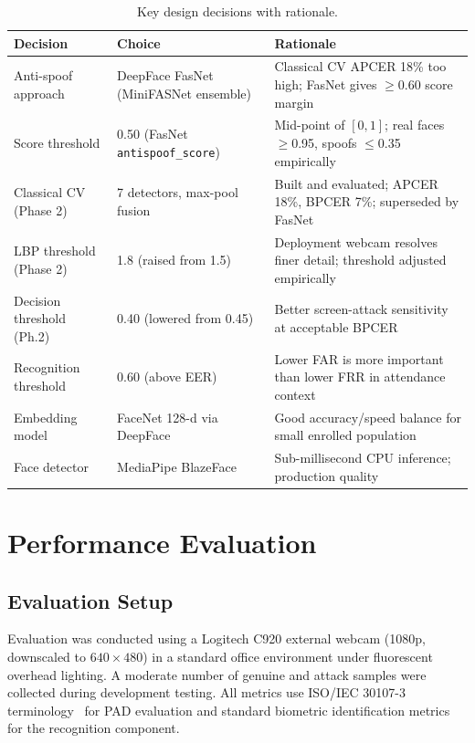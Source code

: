 \documentclass[11pt,a4paper]{article}
\begin{document}
\begin{table}[H]
\centering
\caption{Key design decisions with rationale.}
\label{tab:decisions}
\renewcommand{\arraystretch}{1.25}
\begin{tabularx}{\textwidth}{@{}lXX@{}}
\toprule
\textbf{Decision} & \textbf{Choice} & \textbf{Rationale} \\
\midrule
Anti-spoof approach    & DeepFace FasNet (MiniFASNet ensemble)   & Classical CV APCER 18\% too high; FasNet gives $\geq$0.60 score margin \\
Score threshold        & 0.50 (FasNet \texttt{antispoof\_score}) & Mid-point of $[0,1]$; real faces $\geq$0.95, spoofs $\leq$0.35 empirically \\
Classical CV (Phase 2) & 7 detectors, max-pool fusion & Built and evaluated; APCER 18\%, BPCER 7\%; superseded by FasNet \\
LBP threshold (Phase 2)& 1.8 (raised from 1.5)        & Deployment webcam resolves finer detail; threshold adjusted empirically \\
Decision threshold (Ph.2) & 0.40 (lowered from 0.45)  & Better screen-attack sensitivity at acceptable BPCER \\
Recognition threshold  & 0.60 (above EER)             & Lower FAR is more important than lower FRR in attendance context \\
Embedding model        & FaceNet 128-d via DeepFace   & Good accuracy/speed balance for small enrolled population \\
Face detector          & MediaPipe BlazeFace          & Sub-millisecond CPU inference; production quality \\
\bottomrule
\end{tabularx}
\end{table}

\section{Performance Evaluation}
\label{sec:evaluation}

\subsection{Evaluation Setup}

Evaluation was conducted using a Logitech C920 external webcam (1080p, downscaled
to $640\times 480$) in a standard office environment under fluorescent overhead
lighting.
A moderate number of genuine and attack samples were collected during development
testing.
All metrics use ISO/IEC 30107-3 terminology~\cite{iso30107} for PAD evaluation
and standard biometric identification metrics for the recognition component.
\end{document}
